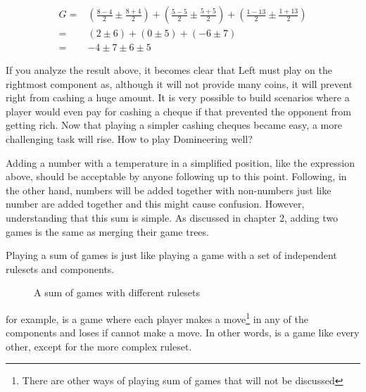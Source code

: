 \begin{align*}
	G =& \left(\frac{8-4}{2} \pm \frac{8+4}{2}\right) + \left(\frac{5-5}{2} \pm \frac{5+5}{2}\right) + \left(\frac{1-13}{2} \pm \frac{1+13}{2}\right) \\
	  =& (2 \pm 6) + (0 \pm 5) + (-6 \pm 7)\\
	  =& -4 \pm 7 \pm 6 \pm 5
\end{align*}

If you analyze the result above, it becomes clear that Left must play on the rightmost component as, although it will not provide many coins, it will prevent right from cashing a huge amount. It is very possible to build scenarios where a player would even pay for cashing a cheque if that prevented the opponent from getting rich. Now that playing a simpler cashing cheques became easy, a more challenging task will rise. How to play Domineering well?

Adding a number with a temperature in a simplified position, like the expression above, should be acceptable by anyone following up to this point. Following, in the other hand, numbers will be added together with non-numbers just like number are added together and this might cause confusion. However, understanding that this sum is simple. As discussed in chapter 2, adding two games is the same as merging their game trees.

Playing a sum of games is just like playing a game with a set of independent rulesets and components.

\begin{figure}[H]
\begin{center}
\end{center}
\caption{A sum of games with different rulesets}
\end{figure}

for example, is a game where each player makes a move\footnote{There are other ways of playing sum of games that will not be discussed} in any of the components and loses if cannot make a move. In other words, \Gm{} is a game like every other, except for the more complex ruleset.

